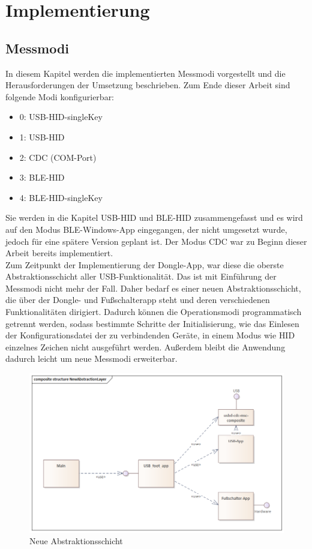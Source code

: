 \section{Implementierung}
\label{Implementierung}

\subsection{Messmodi}
\label{Messmodi}
In diesem Kapitel werden die implementierten Messmodi vorgestellt und die Herausforderungen der Umsetzung beschrieben. Zum Ende dieser Arbeit sind folgende Modi konfigurierbar:
\begin{itemize}
	\item 0: \ac{USB}-\ac{HID}-singleKey
	\item 1: \ac{USB}-\ac{HID}
	\item 2: \ac{CDC} (COM-Port)
	\item 3: \ac{BLE}-\ac{HID}
	\item 4: \ac{BLE}-\ac{HID}-singleKey
\end{itemize}
Sie werden in die Kapitel \ac{USB}-\ac{HID} und \ac{BLE}-\ac{HID} zusammengefasst und es wird auf den Modus \ac{BLE}-Windows-App eingegangen, der nicht umgesetzt wurde, jedoch für eine spätere Version geplant ist. Der Modus \ac{CDC} war zu Beginn dieser Arbeit bereits implementiert. \\
Zum Zeitpunkt der Implementierung der Dongle-App, war diese die oberste Abstraktionsschicht aller USB-Funktionalität. Das ist mit Einführung der Messmodi nicht mehr der Fall. Daher bedarf es einer neuen Abstraktionsschicht, die über der Dongle- und Fußschalterapp steht und deren verschiedenen Funktionalitäten dirigiert. Dadurch können die Operationsmodi programmatisch getrennt werden, sodass bestimmte Schritte der Initialisierung, wie das Einlesen der Konfigurationsdatei der zu verbindenden Geräte, in einem Modus wie \ac{HID} einzelnes Zeichen nicht ausgeführt werden. Außerdem bleibt die Anwendung dadurch leicht um neue Messmodi erweiterbar. 

\begin{figure}[H] 
	\centering
	\includegraphics[width=\textwidth]{figures/NewAbstractionLayer.png}
	\caption{Neue Abstraktionsschicht}
\end{figure}

